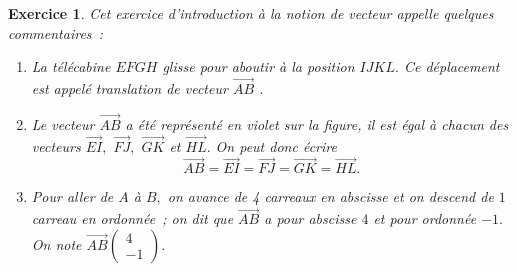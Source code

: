 \documentclass[10pt]{article}
\newtheorem{exo}{Exercice}
\begin{document}
\begin{exo}


Cet exercice d'introduction à la notion de vecteur appelle quelques commentaires~:

\begin{enumerate}
\item La télécabine $EFGH$ glisse pour aboutir à la position $IJKL.$ Ce déplacement est appelé \og translation de vecteur $\overrightarrow{AB}$ \fg.
\item Le vecteur $\overrightarrow{AB}$ a été représenté en violet sur la figure, il est égal à chacun des vecteurs $\overrightarrow{EI},$ $\overrightarrow{FJ},$ $\overrightarrow{GK}$ et $\overrightarrow{HL}.$ On peut donc écrire
\[\overrightarrow{AB}=\overrightarrow{EI}=\overrightarrow{FJ}=\overrightarrow{GK}=\overrightarrow{HL}.\]
\item Pour aller de $A$ à $B,$ on avance de 4 carreaux en abscisse et on descend de $1$ carreau en ordonnée~; on dit que $\overrightarrow{AB}$ a pour abscisse $4$ et pour ordonnée $-1.$ On note $\overrightarrow{AB}\begin{pmatrix} 4\\-1 \end{pmatrix}.$
\end{enumerate}


\end{exo}
\end{document}
